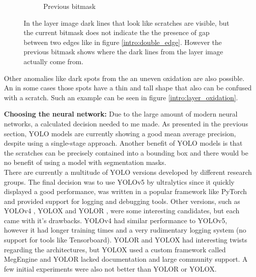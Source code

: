 \begin{figure}[!h]
\begin{subfigure}{.33\textwidth}
  \caption{Previous bitmask}
\end{subfigure}
\caption{In the layer image dark lines that look like scratches are visible, but the current bitmask does not indicate the the presence of gap between two edges like in figure \ref{intro:double_edge}. However the previous bitmask shows where the dark lines from the layer image actually come from.}
\label{intro:image_artifacts}
\end{figure}

Other anomalies like dark spots from the an uneven oxidation are also possible. An in some cases those spots have a thin and tall shape that also can be confused with a scratch. Such an example can be seen in figure \ref{intro:layer_oxidation}.


\textbf{Choosing the neural network:}
Due to the large amount of modern neural networks, a calculated decision needed to me made. As presented in the previous section, YOLO models are currently showing a good mean average precision, despite using a single-stage approach. Another benefit of YOLO models is that the scratches can be precisely contained into a bounding box and there would be no benefit of using a model with segmentation masks. \\
There are currently a multitude of YOLO versions developed by different research groups. The final decision was to use YOLOv5 by ultralytics \cite{yolov5_git} since it quickly displayed a good performance, was written in a popular framework like PyTorch and provided support for logging and debugging tools. Other versions, such as YOLOv4 \cite{yolov4_paper}, YOLOX \cite{yolox_paper} and YOLOR \cite{yolor_paper}, were some interesting candidates, but each came with it's drawbacks. YOLOv4 had similar performance to YOLOv5, however it had longer training times and a very rudimentary logging system (no support for tools like Tensorboard). YOLOR and YOLOX had interesting twists regarding the architectures, but YOLOX used a custom framework called MegEngine \cite{megengine_git} and YOLOR lacked documentation and large community support. A few initial experiments were also not better than YOLOR or YOLOX. \\
